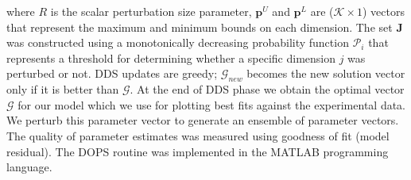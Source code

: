 \documentclass[12pt]{article}
\begin{document}
where ${R}$ is the scalar perturbation size parameter, $\mathbf{p}^U$ and $\mathbf{p}^L$ are ($\mathcal{K}\times{1}$) vectors that represent the maximum and minimum bounds on each dimension. The set $\mathbf{J}$ was constructed using a monotonically decreasing probability function $\mathcal{P}_{i}$ that represents a threshold for determining whether a specific dimension $j$ was perturbed or not. DDS updates are greedy; $\mathcal{G}_{new}$ becomes the new solution vector only if it is better than $\mathcal{G}$.
At the end of DDS phase we obtain the optimal vector  $\mathcal{G}$ for our model which we use for plotting best fits against the experimental data. We perturb this parameter vector to generate an ensemble of parameter vectors. The quality of parameter estimates was measured using goodness of fit (model residual).  The DOPS routine was implemented in the MATLAB programming language.

\end{document}
